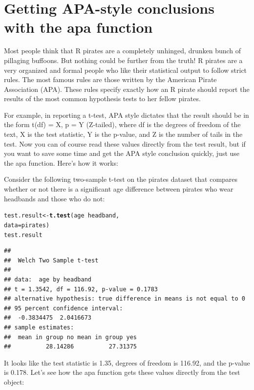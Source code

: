 \documentclass{tufte-book}\usepackage[]{graphicx}\usepackage[]{color}
\makeatletter
\newcommand{\hlopt}[1]{\textcolor[rgb]{0,0,0}{#1}}%
\newcommand{\hlstd}[1]{\textcolor[rgb]{0.345,0.345,0.345}{#1}}%
\newcommand{\hlkwb}[1]{\textcolor[rgb]{0.69,0.353,0.396}{#1}}%
\newcommand{\hlkwc}[1]{\textcolor[rgb]{0.333,0.667,0.333}{#1}}%
\newcommand{\hlkwd}[1]{\textcolor[rgb]{0.737,0.353,0.396}{\textbf{#1}}}%
\newenvironment{kframe}{%
 \def\at@end@of@kframe{}%
 \ifinner\ifhmode%
  \def\at@end@of@kframe{\end{minipage}}%
  \begin{minipage}{\columnwidth}%
 \fi\fi%
 \def\FrameCommand##1{\hskip\@totalleftmargin \hskip-\fboxsep
 \colorbox{shadecolor}{##1}\hskip-\fboxsep
     \hskip-\linewidth \hskip-\@totalleftmargin \hskip\columnwidth}%
 \MakeFramed {\advance\hsize-\width
   \@totalleftmargin\z@ \linewidth\hsize
   \@setminipage}}%
 {\par\unskip\endMakeFramed%
 \at@end@of@kframe}
\newenvironment{knitrout}{}{} %
\makeatother
\begin{document}
\section{Getting APA-style conclusions with the apa function}

Most people think that R pirates are a completely unhinged, drunken bunch of pillaging buffoons. But nothing could be further from the truth! R pirates are a very organized and formal people who like their statistical output to follow strict rules. The most famous rules are those written by the American Pirate Association (APA). These rules specify exactly how an R pirate should report the results of the most common hypothesis tests to her fellow pirates.

For example, in reporting a t-test, APA style dictates that the result should be in the form t(df) = X, p = Y (Z-tailed), where df is the degrees of freedom of the text, X is the test statistic, Y is the p-value, and Z is the number of tails in the test. Now you can of course read these values directly from the test result, but if you want to save some time and get the APA style conclusion quickly, just use the apa function. Here's how it works:

Consider the following two-sample t-test on the pirates dataset that compares whether or not there is a significant age difference between pirates who wear headbands and those who do not:

\begin{knitrout}
\color{fgcolor}\begin{kframe}
\begin{alltt}
\hlstd{test.result} \hlkwb{<-} \hlkwd{t.test}\hlstd{(age} \hlopt{~} \hlstd{headband,}
                      \hlkwc{data} \hlstd{= pirates)}
\hlstd{test.result}
\end{alltt}
\begin{verbatim}
## 
## 	Welch Two Sample t-test
## 
## data:  age by headband
## t = 1.3542, df = 116.92, p-value = 0.1783
## alternative hypothesis: true difference in means is not equal to 0
## 95 percent confidence interval:
##  -0.3834475  2.0416673
## sample estimates:
##  mean in group no mean in group yes 
##          28.14286          27.31375
\end{verbatim}
\end{kframe}
\end{knitrout}

It looks like the test statistic is 1.35, degrees of freedom is 116.92, and the p-value is 0.178. Let's see how the apa function gets these values directly from the test object:
\end{document}
